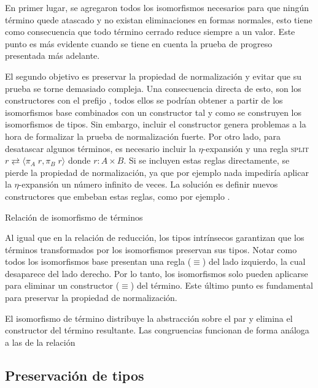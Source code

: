 En primer lugar, se agregaron todos los isomorfismos necesarios para que ningún término quede atascado y no existan eliminaciones en formas normales, esto tiene como consecuencia que todo término cerrado reduce siempre a un valor.
Este punto es más evidente cuando se tiene en cuenta la prueba de progreso presentada más adelante.

El segundo objetivo es preservar la propiedad de normalización y evitar que su prueba se torne demasiado compleja.
Una consecuencia directa de esto, son los constructores con el prefijo , todos ellos se podrían obtener a partir de los isomorfismos base combinados con un constructor  tal y como se construyen los isomorfismos de tipos.
Sin embargo, incluir el constructor  genera problemas a la hora de formalizar la prueba de normalización fuerte.
Por otro lado, para desatascar algunos términos, es necesario incluir la $\eta$-expansión y una regla \textsc{split} $r \rightleftarrows \langle \pi_A\; r , \pi_B\; r \rangle$ donde $r: A \times B$.
Si se incluyen estas reglas directamente, se pierde la propiedad de normalización, ya que por ejemplo nada impediría aplicar la $\eta$-expansión un número infinito de veces.
La solución es definir nuevos constructores que embeban estas reglas, como por ejemplo .


\begin{codigo}
	Relación de isomorfismo de términos
	
\end{codigo}

Al igual que en la relación de reducción, los tipos intrínsecos garantizan que los términos transformados por los isomorfismos preservan sus tipos.
Notar como todos los isomorfismos base presentan una regla ($\equiv$) del lado izquierdo, la cual desaparece del lado derecho.
Por lo tanto, los isomorfismos solo pueden aplicarse para eliminar un constructor ($\equiv$) del término.
Este último punto es fundamental para preservar la propiedad de normalización.

\begin{example}
	El isomorfismo de término  distribuye la abstracción sobre el par y elimina el constructor  del término resultante.
	Las congruencias funcionan de forma análoga a las de la relación \type{$\_\hookrightarrow\_$}
\end{example}

\subsection{Preservación de tipos}

